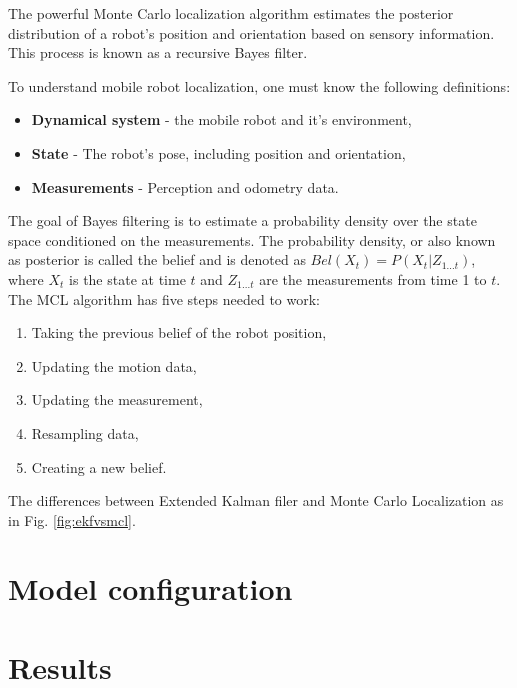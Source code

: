 \documentclass[10pt,journal,compsoc]{IEEEtran}
\begin{document}
    The powerful Monte Carlo localization algorithm estimates the posterior distribution of a robot’s position and orientation based on sensory information. This process is known as a recursive Bayes filter.

    \noindent To understand mobile robot localization, one must know the following definitions:

    \begin{itemize}
        \item \textbf{Dynamical system} - the mobile robot and it's environment,
        \item \textbf{State} - The robot's pose, including position and orientation,
        \item \textbf{Measurements} - Perception and odometry data.
    \end{itemize}

    The goal of Bayes filtering is to estimate a probability density over the state space conditioned on the measurements. The probability density, or also known as posterior is called the belief and is denoted as $Bel(X_{t}) = P(X_{t}|Z_{1...t})$, where $X_{t}$ is the state at time $t$ and $Z_{1...t}$ are the measurements from time 1 to $t$.\\

    \noindent The MCL algorithm has five steps needed to work:

    \begin{enumerate}
        \item Taking the previous belief of the robot position,
        \item Updating the motion data,
        \item Updating the measurement,
        \item Resampling data,
        \item Creating a new belief.
    \end{enumerate}

    The differences between Extended Kalman filer and Monte Carlo Localization as in Fig. \ref{fig:ekfvsmcl}.

    \section{Model configuration}

    \section{Results}
\end{document}
